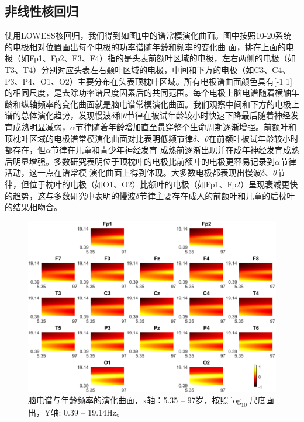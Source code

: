 \subsection{非线性核回归}
使用LOWESS核回归，我们得到如图\ref{surf}中的谱常模演化曲面。图中按照10-20系统的电极相对位置画出每个电极的功率谱随年龄和频率的变化曲
面，排在上面的电极（如Fp1、Fp2、F3、F4）指的是头表前额叶区域的电极，左右两侧的电极（如T3、T4）分别对应头表左右颞叶区域的电极，中间和下方的电极（如C3、C4、P3、P4、O1、O2）主要分布在头表顶枕叶区域。所有电极谱曲面颜色具有[-1 1]的相同尺度，是去除功率谱尺度因素后的共同范围。每个电极上脑电谱随着横轴年龄和纵轴频率的变化曲面就是脑电谱常模演化曲面。我们观察中间和下方的电极上谱的总体演化趋势，发现慢波$\delta$和$\theta$节律在被试年龄较小时快速下降最后随着神经发育成熟明显减弱，$\alpha$节律随着年龄增加直至贯穿整个生命周期逐渐增强。前额叶和
顶枕叶区域的电极谱常模演化曲面对比表明低频节律$\delta$、$\theta$在前额叶被试年龄较小时都存在，但$\alpha$节律在儿童和青少年神经发育
成熟前逐渐出现并在成年神经发育成熟后明显增强。多数研究表明位于顶枕叶的电极比前额叶的电极更容易记录到$\alpha$节律活动，这一点在谱常模
演化曲面上得到体现。大多数电极都表现出慢波$\delta$、$\theta$节律，但位于枕叶的电极（如O1、O2）比额叶的电极（如Fp1、Fp2）呈现衰减更快
的趋势，这与多数研究中表明的慢波$\delta$节律主要存在成人的前额叶和儿童的后枕叶的结果相吻合。
\begin{figure}[!ht]
\includegraphics[width=15cm]{pic/Norm/figure6.png}
\caption{脑电谱与年龄频率的演化曲面，x轴：5.35 – 97岁，按照$\log_{10}$尺度画出，Y轴: 0.39 – 19.14Hz。}
\label{surf}
\end{figure}

